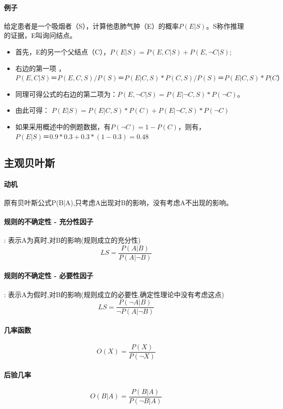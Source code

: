 \documentclass[UTF8,a4paper]{ctexart}
\begin{document}
\paragraph{例子}给定患者是一个吸烟者（S），计算他患肺气肿（E）的概率$P(E|S)$。S称作推理的证据，E叫询问结点。
\begin{itemize}
	\item 首先，E的另一个父结点（C），$P(E|S)=P(E,C|S)+P(E,\lnot C|S)$;
	\item 右边的第一项 ，
	      $P(E,C|S)＝P(E,C,S)/P(S)＝P(E|C,S)*P(C,S)/P(S)＝P(E|C,S)*P(C）$
	\item 同理可得公式的右边的第二项为：$P(E,\lnot C|S) = P(E|\lnot C,S)*P(\lnot C)$。
	\item 由此可得：
	      $P(E|S)  =  P(E| C,S)*P(C)+P(E|\lnot C,S)*P(\lnot C)$
	\item 如果采用概述中的例题数据，有$P(\lnot C) = 1 - P(C)$，则有，
	      $P(E|S)＝0.9*0.3+0.3*(1-0.3)=0.48$
\end{itemize}



\subsection{主观贝叶斯}
\paragraph{动机} 原有贝叶斯公式P(B|A),只考虑A出现对B的影响，没有考虑A不出现的影响。

\paragraph{规则的不确定性 - 充分性因子} : 表示A为真时,对B的影响(规则成立的充分性)
\[LS = \frac{P(A|B)}{P(A|\lnot B)} \]

\paragraph{规则的不确定性 - 必要性因子} : 表示A为假时,对B的影响(规则成立的必要性,确定性理论中没有考虑这点)
\[LS = \frac{P(\lnot A|B)}{\lnot P(A|\lnot B)} \]

\paragraph{几率函数}
\[O(X) = \frac{P(X)}{P(\lnot X)}\]

\paragraph{后验几率}
\[O(B|A) = \frac{P(B|A)}{P(\lnot B|A)}\]
\end{document}
